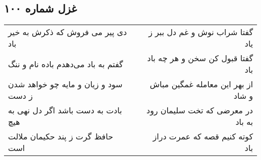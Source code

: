 \begin{center}
\section*{غزل شماره ۱۰۰}
\label{sec:sh100}
\begin{longtable}{l p{0.5cm} r}
دی پیر می فروش که ذکرش به خیر باد
&&
گفتا شراب نوش و غم دل ببر ز یاد
\\
گفتم به باد می‌دهدم باده نام و ننگ
&&
گفتا قبول کن سخن و هر چه باد باد
\\
سود و زیان و مایه چو خواهد شدن ز دست
&&
از بهر این معامله غمگین مباش و شاد
\\
بادت به دست باشد اگر دل نهی به هیچ
&&
در معرضی که تخت سلیمان رود به باد
\\
حافظ گرت ز پند حکیمان ملالت است
&&
کوته کنیم قصه که عمرت دراز باد
\\
\end{longtable}
\end{center}
